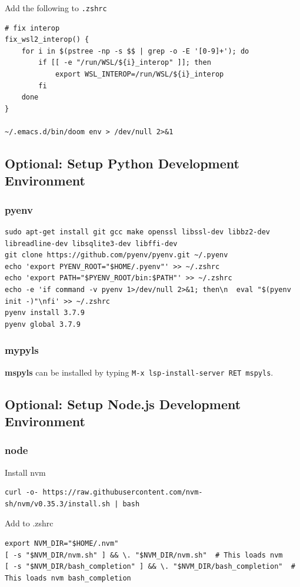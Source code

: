\documentclass[10pt]{article}
\begin{document}
Add the following to \texttt{.zshrc}
\begin{verbatim}
# fix interop
fix_wsl2_interop() {
	for i in $(pstree -np -s $$ | grep -o -E '[0-9]+'); do
		if [[ -e "/run/WSL/${i}_interop" ]]; then
			export WSL_INTEROP=/run/WSL/${i}_interop
		fi
	done
}

~/.emacs.d/bin/doom env > /dev/null 2>&1
\end{verbatim}

\subsection{Optional: Setup Python Development Environment}
\label{sec:orgd144a3d}
\subsubsection{pyenv}
\label{sec:org9afd117}
\begin{verbatim}
sudo apt-get install git gcc make openssl libssl-dev libbz2-dev libreadline-dev libsqlite3-dev libffi-dev
git clone https://github.com/pyenv/pyenv.git ~/.pyenv
echo 'export PYENV_ROOT="$HOME/.pyenv"' >> ~/.zshrc
echo 'export PATH="$PYENV_ROOT/bin:$PATH"' >> ~/.zshrc
echo -e 'if command -v pyenv 1>/dev/null 2>&1; then\n  eval "$(pyenv init -)"\nfi' >> ~/.zshrc
pyenv install 3.7.9
pyenv global 3.7.9
\end{verbatim}

\subsubsection{mypyls}
\label{sec:org21a60b5}
\textbf{mspyls} can be installed by typing \texttt{M-x lsp-install-server RET mspyls}.

\subsection{Optional: Setup Node.js Development Environment}
\label{sec:org5f5c095}
\subsubsection{node}
\label{sec:orgdc34941}
Install nvm
\begin{verbatim}
curl -o- https://raw.githubusercontent.com/nvm-sh/nvm/v0.35.3/install.sh | bash
\end{verbatim}

Add to .zshrc
\begin{verbatim}
export NVM_DIR="$HOME/.nvm"
[ -s "$NVM_DIR/nvm.sh" ] && \. "$NVM_DIR/nvm.sh"  # This loads nvm
[ -s "$NVM_DIR/bash_completion" ] && \. "$NVM_DIR/bash_completion"  # This loads nvm bash_completion
\end{verbatim}
\end{document}
